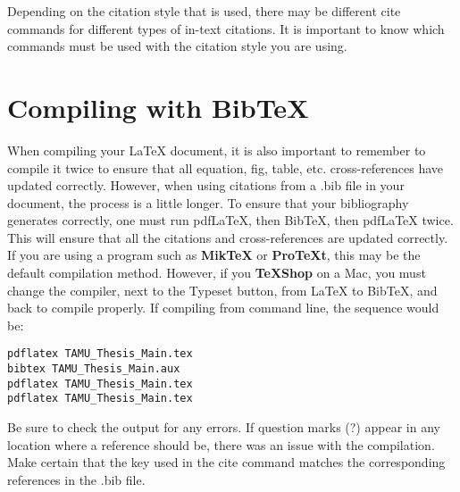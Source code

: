 Depending on the citation style that is used, there may be different cite commands for different types of in-text citations. It is important to know which commands must be used with the citation style you are using.

\section{Compiling with BibTeX}
When compiling your \LaTeX{} document, it is also important to remember to compile it twice to ensure that all equation, fig, table, etc. cross-references have updated correctly. However, when using citations from a .bib file in your document, the process is a little longer. To ensure that your bibliography generates correctly, one must run pdfLaTeX, then BibTeX, then pdfLaTeX twice. This will ensure that all the citations and cross-references are updated correctly. If you are using a program such as \textbf{MikTeX} or \textbf{ProTeXt}, this may be the default compilation method. However, if you \textbf{TeXShop} on a Mac, you must change the compiler, next to the Typeset button, from LaTeX to BibTeX, and back to compile properly. If compiling from command line, the sequence would be:

{\footnotesize \begin{verbatim}
pdflatex TAMU_Thesis_Main.tex
bibtex TAMU_Thesis_Main.aux
pdflatex TAMU_Thesis_Main.tex
pdflatex TAMU_Thesis_Main.tex
\end{verbatim}}

Be sure to check the output for any errors. If question marks (?) appear in any location where a reference should be, there was an issue with the compilation. Make certain that the key used in the cite command matches the corresponding references in the .bib file.